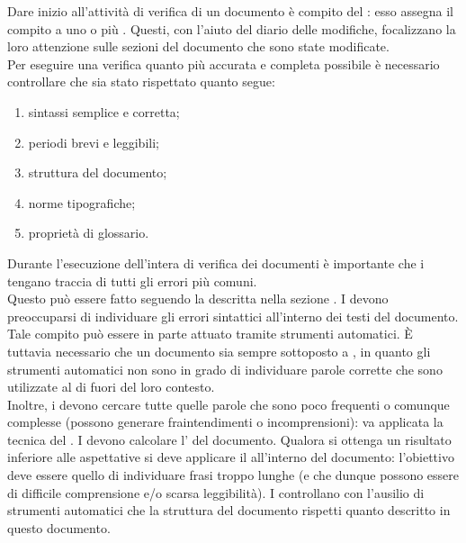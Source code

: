 					Dare inizio all'attività di verifica di un documento è compito del : esso assegna il compito a uno o più . Questi, con l'aiuto del diario delle modifiche, focalizzano la loro attenzione sulle sezioni del documento che sono state modificate.\\
Per eseguire una verifica quanto più accurata e completa possibile è necessario controllare che sia stato rispettato quanto segue:
					\begin{enumerate}
						\item sintassi semplice e corretta;
						\item periodi brevi e leggibili;
						\item struttura del documento;
						\item norme tipografiche;
						\item proprietà di glossario.
					\end{enumerate}
					Durante l'esecuzione dell'intera  di verifica dei documenti è importante che i  tengano traccia di tutti gli errori più comuni.\\ Questo può essere fatto seguendo la  descritta nella sezione .
						I  devono preoccuparsi di individuare gli errori sintattici all'interno dei testi del documento. Tale compito può essere in parte attuato tramite strumenti automatici. È tuttavia necessario che un documento sia sempre sottoposto a \textit{}, in quanto gli strumenti automatici non sono in grado di individuare parole corrette che sono utilizzate al di fuori del loro contesto.\\ Inoltre, i  devono cercare tutte quelle parole che sono poco frequenti o comunque complesse (possono generare fraintendimenti o incomprensioni): va applicata la tecnica del \textit{}.
						I  devono calcolare l' del documento. Qualora si ottenga un risultato inferiore alle aspettative si deve applicare il \textit{} all'interno del documento: l'obiettivo deve essere quello di individuare frasi troppo lunghe (e che dunque possono essere di difficile comprensione e/o scarsa leggibilità).
						I  controllano con l'ausilio di strumenti automatici che la struttura del documento rispetti quanto descritto in questo documento.
